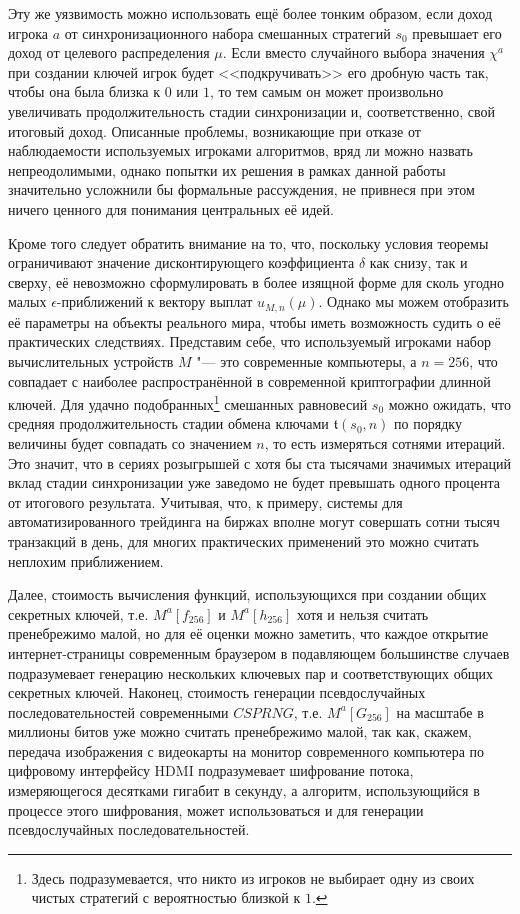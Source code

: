 Эту же уязвимость можно использовать ещё более тонким образом, если доход игрока $a$ от синхронизационного набора смешанных стратегий $s_0$ превышает его доход от целевого распределения $\mu$. Если вместо случайного выбора значения $\chi^a$ при создании ключей игрок будет <<подкручивать>> его дробную часть так, чтобы она была близка к $0$ или $1$, то тем самым он может произвольно увеличивать продолжительность стадии синхронизации и, соответственно, свой итоговый доход. Описанные проблемы, возникающие при отказе от наблюдаемости используемых игроками алгоритмов, вряд ли можно назвать непреодолимыми, однако попытки их решения в рамках данной работы значительно усложнили бы формальные рассуждения, не привнеся при этом ничего ценного для понимания центральных её идей.

Кроме того следует обратить внимание на то, что, поскольку условия теоремы ограничивают значение дисконтирующего коэффициента $\delta$ как снизу, так и сверху, её невозможно сформулировать в более изящной форме для сколь угодно малых $\epsilon$-приближений к вектору выплат $u_{M,n}(\mu)$. Однако мы можем отобразить её параметры на объекты реального мира, чтобы иметь возможность судить о её практических следствиях. Представим себе, что используемый игроками набор вычислительных устройств $M$ "--- это современные компьютеры, а $n = 256$, что совпадает с наиболее распространённой в современной криптографии длинной ключей. Для удачно подобранных\footnote{Здесь подразумевается, что никто из игроков не выбирает одну из своих чистых стратегий с вероятностью близкой к $1$.} смешанных равновесий $s_0$ можно ожидать, что средняя продолжительность стадии обмена ключами $\mathfrak{t}(s_0, n)$ по порядку величины будет совпадать со значением $n$, то есть измеряться сотнями итераций. Это значит, что в сериях розыгрышей с хотя бы ста тысячами значимых итераций вклад стадии синхронизации уже заведомо не будет превышать одного процента от итогового результата. Учитывая, что, к примеру, системы для автоматизированного трейдинга на биржах вполне могут совершать сотни тысяч транзакций в день, для многих практических применений это можно считать неплохим приближением.

Далее, стоимость вычисления функций, использующихся при создании общих секретных ключей, т.е. $M^a[f_{256}]$ и $M^a[h_{256}]$ хотя и нельзя считать пренебрежимо малой, но для её оценки можно заметить, что каждое открытие интернет-страницы современным браузером в подавляющем большинстве случаев подразумевает генерацию нескольких ключевых пар и соответствующих общих секретных ключей. Наконец, стоимость генерации псевдослучайных последовательностей современными $CSPRNG$, т.е. $M^a[G_{256}]$ на масштабе в миллионы битов уже можно считать пренебрежимо малой, так как, скажем, передача изображения с видеокарты на монитор современного компьютера по цифровому интерфейсу HDMI подразумевает шифрование потока, измеряющегося десятками гигабит в секунду, а алгоритм, использующийся в процессе этого шифрования, может использоваться и для генерации псевдослучайных последовательностей.

